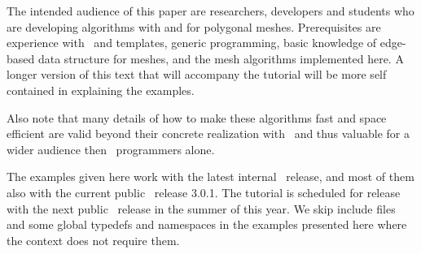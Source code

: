 The intended audience of this paper are researchers, developers and
students
who are
developing algorithms with and for polygonal meshes. Prerequisites are
experience with \CC\ and templates, generic programming, basic
knowledge of edge-based data structure for meshes, and the mesh
algorithms implemented here. A longer version of this text that will
accompany the tutorial will be more self contained in explaining the
examples.

Also note that many details of how to make these algorithms fast and
space efficient are valid beyond their concrete realization with
\cgal\ and thus valuable for a wider audience then \cgal\ programmers
alone.

The examples given here work with the latest internal \cgal\ release,
and most of them also with the current public \cgal\ release
3.0.1. The tutorial is scheduled for release with the next public
\cgal\ release in the summer of this year. We skip include files and some
global typedefs and namespaces in the examples presented here where
the context does not require them.





